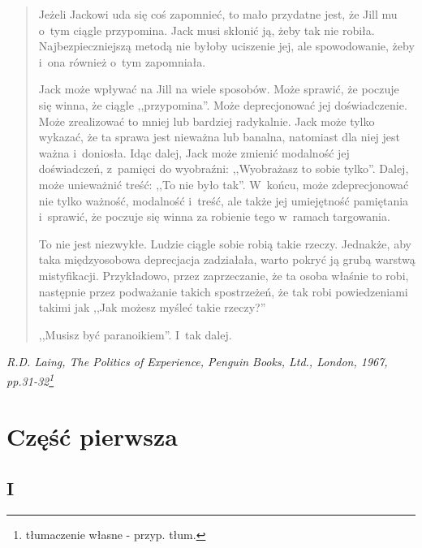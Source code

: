 \documentclass[oneside,polish,12pt,sfheadings]{mwbk}
\begin{document}
\begin{quotation}
Jeżeli Jackowi uda się coś zapomnieć, to mało przydatne jest, że Jill
mu o~tym ciągle przypomina. Jack musi skłonić ją, żeby tak nie robiła.
Najbezpieczniejszą metodą nie byłoby uciszenie jej, ale spowodowanie,
żeby i~ona również o~tym zapomniała.

Jack może wpływać na Jill na wiele sposobów. Może sprawić, że poczuje
się winna, że ciągle ,,przypomina''. Może deprecjonować jej doświadczenie.
Może zrealizować to mniej lub bardziej radykalnie. Jack może tylko
wykazać, że ta sprawa jest nieważna lub banalna, natomiast dla niej
jest ważna i~doniosła. Idąc dalej, Jack może zmienić modalność jej
doświadczeń, z~pamięci do wyobraźni: ,,Wyobrażasz to sobie tylko''.
Dalej, może unieważnić treść: ,,To nie było tak''. W~końcu, może zdeprecjonować
nie tylko ważność, modalność i~treść, ale także jej umiejętność pamiętania i~sprawić, że poczuje się winna za robienie tego w~ramach targowania.

To nie jest niezwykłe. Ludzie ciągle sobie robią takie rzeczy. Jednakże,
aby taka międzyosobowa deprecjacja zadziałała, warto pokryć ją grubą
warstwą mistyfikacji. Przykładowo, przez zaprzeczanie, że ta osoba
właśnie to robi, następnie przez podważanie takich spostrzeżeń, że
tak robi powiedzeniami takimi jak ,,Jak możesz myśleć takie rzeczy?''

,,Musisz być paranoikiem''. I~tak dalej.
\end{quotation}
\textit{R.D. Laing, The Politics of Experience, Penguin Books, Ltd., London,
1967, pp.31-32\footnote{tłumaczenie własne - przyp. tłum.}}


\part*{Część pierwsza}

\chapter{I}
\end{document}

